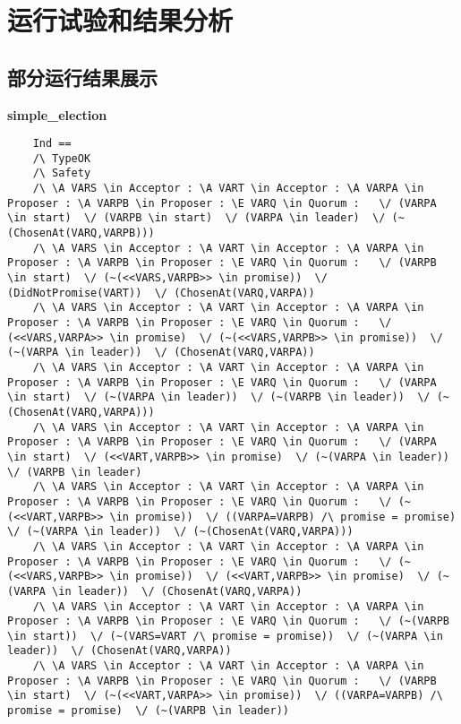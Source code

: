 \chapter{运行试验和结果分析}\label{chap:run-analysis}

\section{部分运行结果展示}
\textbf{simple\_election}
\begin{lstlisting}
    Ind == 
    /\ TypeOK
    /\ Safety
    /\ \A VARS \in Acceptor : \A VART \in Acceptor : \A VARPA \in Proposer : \A VARPB \in Proposer : \E VARQ \in Quorum :   \/ (VARPA \in start)  \/ (VARPB \in start)  \/ (VARPA \in leader)  \/ (~(ChosenAt(VARQ,VARPB)))
    /\ \A VARS \in Acceptor : \A VART \in Acceptor : \A VARPA \in Proposer : \A VARPB \in Proposer : \E VARQ \in Quorum :   \/ (VARPB \in start)  \/ (~(<<VARS,VARPB>> \in promise))  \/ (DidNotPromise(VART))  \/ (ChosenAt(VARQ,VARPA))
    /\ \A VARS \in Acceptor : \A VART \in Acceptor : \A VARPA \in Proposer : \A VARPB \in Proposer : \E VARQ \in Quorum :   \/ (<<VARS,VARPA>> \in promise)  \/ (~(<<VARS,VARPB>> \in promise))  \/ (~(VARPA \in leader))  \/ (ChosenAt(VARQ,VARPA))
    /\ \A VARS \in Acceptor : \A VART \in Acceptor : \A VARPA \in Proposer : \A VARPB \in Proposer : \E VARQ \in Quorum :   \/ (VARPA \in start)  \/ (~(VARPA \in leader))  \/ (~(VARPB \in leader))  \/ (~(ChosenAt(VARQ,VARPA)))
    /\ \A VARS \in Acceptor : \A VART \in Acceptor : \A VARPA \in Proposer : \A VARPB \in Proposer : \E VARQ \in Quorum :   \/ (VARPA \in start)  \/ (<<VART,VARPB>> \in promise)  \/ (~(VARPA \in leader))  \/ (VARPB \in leader)
    /\ \A VARS \in Acceptor : \A VART \in Acceptor : \A VARPA \in Proposer : \A VARPB \in Proposer : \E VARQ \in Quorum :   \/ (~(<<VART,VARPB>> \in promise))  \/ ((VARPA=VARPB) /\ promise = promise)  \/ (~(VARPA \in leader))  \/ (~(ChosenAt(VARQ,VARPA)))
    /\ \A VARS \in Acceptor : \A VART \in Acceptor : \A VARPA \in Proposer : \A VARPB \in Proposer : \E VARQ \in Quorum :   \/ (~(<<VARS,VARPB>> \in promise))  \/ (<<VART,VARPB>> \in promise)  \/ (~(VARPA \in leader))  \/ (ChosenAt(VARQ,VARPA))
    /\ \A VARS \in Acceptor : \A VART \in Acceptor : \A VARPA \in Proposer : \A VARPB \in Proposer : \E VARQ \in Quorum :   \/ (~(VARPB \in start))  \/ (~(VARS=VART /\ promise = promise))  \/ (~(VARPA \in leader))  \/ (ChosenAt(VARQ,VARPA))
    /\ \A VARS \in Acceptor : \A VART \in Acceptor : \A VARPA \in Proposer : \A VARPB \in Proposer : \E VARQ \in Quorum :   \/ (VARPB \in start)  \/ (~(<<VART,VARPA>> \in promise))  \/ ((VARPA=VARPB) /\ promise = promise)  \/ (~(VARPB \in leader))

\end{lstlisting}
